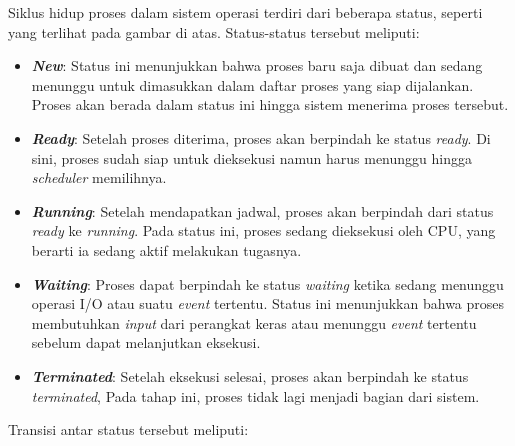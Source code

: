 \documentclass[12pt]{article}
\begin{document}
        Siklus hidup proses dalam sistem operasi terdiri dari beberapa status,
        seperti yang terlihat pada gambar di atas. Status-status tersebut meliputi:
        \begin{itemize}
            \item \textbf{\textit{New}}:
                Status ini menunjukkan bahwa proses baru saja dibuat dan sedang menunggu
                untuk dimasukkan dalam daftar proses yang siap dijalankan. Proses akan
                berada dalam status ini hingga sistem menerima proses tersebut.
            \item \textbf{\textit{Ready}}:
                Setelah proses diterima, proses akan berpindah ke status \textit{ready}.
                Di sini, proses sudah siap untuk dieksekusi namun harus menunggu hingga
                \textit{scheduler} memilihnya.
            \item \textbf{\textit{Running}}:
                Setelah mendapatkan jadwal, proses akan berpindah dari status \textit{ready}
                ke \textit{running}. Pada status ini, proses sedang dieksekusi oleh CPU,
                yang berarti ia sedang aktif melakukan tugasnya.
            \item \textbf{\textit{Waiting}}:
                Proses dapat berpindah ke status \textit{waiting} ketika sedang menunggu
                operasi I/O atau suatu \textit{event} tertentu. Status ini menunjukkan
                bahwa proses membutuhkan \textit{input} dari perangkat keras atau menunggu
                \textit{event} tertentu sebelum dapat melanjutkan eksekusi.    
            \item \textbf{\textit{Terminated}}:
                Setelah eksekusi selesai, proses akan berpindah ke status \textit{terminated},
                Pada tahap ini, proses tidak lagi menjadi bagian dari sistem.
        \end{itemize}
        Transisi antar status tersebut meliputi:
\end{document}
